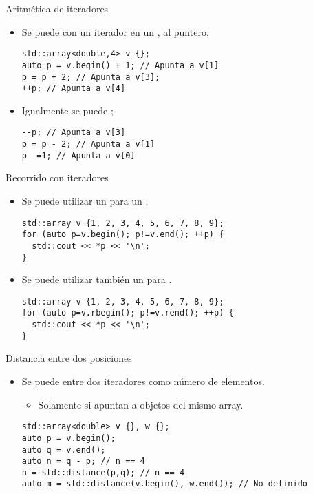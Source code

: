 \begin{frame}[t,fragile]{Aritmética de iteradores}
\begin{itemize}
  \item Se puede  con un iterador en un , 
         al puntero.
\begin{lstlisting}
std::array<double,4> v {};
auto p = v.begin() + 1; // Apunta a v[1]
p = p + 2; // Apunta a v[3];
++p; // Apunta a v[4]
\end{lstlisting}

  \item Igualmente se puede ;
\begin{lstlisting}
--p; // Apunta a v[3]
p = p - 2; // Apunta a v[1]
p -=1; // Apunta a v[0]
\end{lstlisting}
\end{itemize}
\end{frame}

\begin{frame}[t,fragile]{Recorrido con iteradores}
\begin{itemize}
  \item Se puede utilizar un  para 
        un .
\begin{lstlisting}
std::array v {1, 2, 3, 4, 5, 6, 7, 8, 9};
for (auto p=v.begin(); p!=v.end(); ++p) {
  std::cout << *p << '\n';
}
\end{lstlisting}

  \item Se puede utilizar también un  para 
        .
\begin{lstlisting}
std::array v {1, 2, 3, 4, 5, 6, 7, 8, 9};
for (auto p=v.rbegin(); p!=v.rend(); ++p) {
  std::cout << *p << '\n';
}
\end{lstlisting}
\end{itemize}
\end{frame}

\begin{frame}[t,fragile]{Distancia entre dos posiciones}
\begin{itemize}
  \item Se puede  entre dos iteradores 
        como número de elementos.
    \begin{itemize}
      \item Solamente si apuntan a objetos del mismo array.
    \end{itemize}
\begin{lstlisting}
std::array<double> v {}, w {};
auto p = v.begin();
auto q = v.end();
auto n = q - p; // n == 4
n = std::distance(p,q); // n == 4
auto m = std::distance(v.begin(), w.end()); // No definido
\end{lstlisting}
\end{itemize}
\end{frame}

